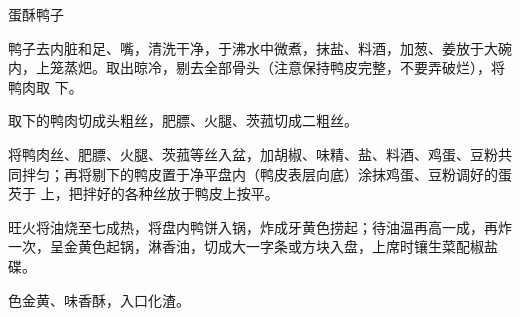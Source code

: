 %
%
%
%
%
%
%
\begin{recipe}{蛋酥鸭子}

\ingredients


\preparation

\step 鸭子去内脏和足、嘴，清洗干净，于沸水中微煮，抹盐、料酒，加葱、姜放于大碗
内，上笼蒸𤆵。取出晾冷，剔去全部骨头（注意保持鸭皮完整，不要弄破烂），将鸭肉取
下。

\step 取下的鸭肉切成头粗丝，肥膘、火腿、茨菰切成二粗丝。

\step 将鸭肉丝、肥膘、火腿、茨菰等丝入盆，加胡椒、味精、盐、料酒、鸡蛋、豆粉共
同拌匀；再将剔下的鸭皮置于净平盘内（鸭皮表层向底）涂抹鸡蛋、豆粉调好的蛋芡于
上，把拌好的各种丝放于鸭皮上按平。

\step 旺火将油烧至七成热，将盘内鸭饼入锅，炸成牙黄色捞起；待油温再高一成，再炸
一次，呈金黄色起锅，淋香油，切成大一字条或方块入盘，上席时镶生菜配椒盐碟。

\features

色金黄、味香酥，入口化渣。

\end{recipe}

